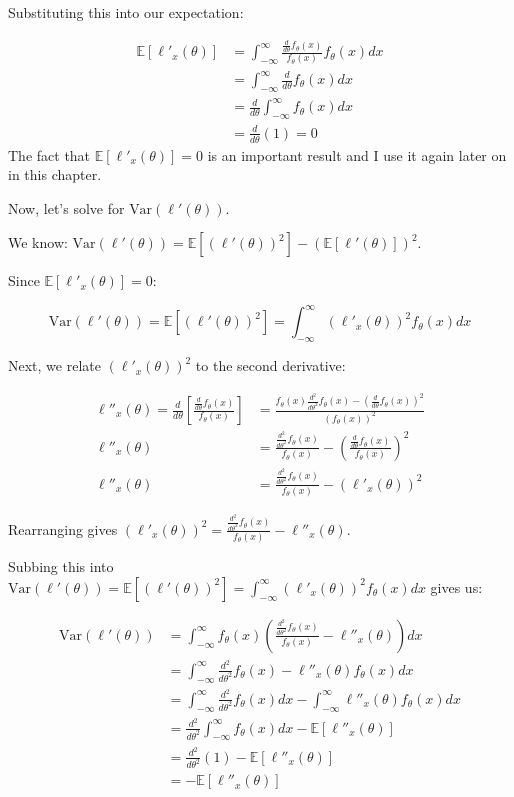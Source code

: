 \documentclass[
  letterpaper,
  DIV=11,
  numbers=noendperiod]{scrreprt}
\begin{document}
Substituting this into our expectation:

\[
\begin{aligned}
\mathbb{E}[\ell'_x(\theta)] &= \int_{-\infty}^\infty \frac{\frac{d}{d \theta} f_\theta(x)}{f_\theta(x)} f_\theta(x) dx \\
&= \int_{-\infty}^\infty \frac{d}{d \theta} f_\theta(x) dx \\
&= \frac{d}{d \theta} \int_{-\infty}^\infty f_\theta(x) dx \\
&= \frac{d}{d \theta} (1) = 0
\end{aligned}
\] The fact that \(\mathbb{E}[\ell'_x(\theta)] = 0\) is an important
result and I use it again later on in this chapter.

Now, let's solve for \(\text{Var}(\ell'(\theta))\).

We know:
\(\text{Var}(\ell'(\theta)) = \mathbb{E}[(\ell'(\theta))^2] - (\mathbb{E}[\ell'(\theta)])^2\).

Since \(\mathbb{E}[\ell'_x(\theta)] = 0\):

\[
\text{Var}(\ell'(\theta)) = \mathbb{E}[(\ell'(\theta))^2] = \int_{-\infty}^\infty (\ell'_x(\theta))^2 f_\theta(x) dx
\]

Next, we relate \((\ell'_x(\theta))^2\) to the second derivative:

\[
\begin{aligned}
\ell''_x(\theta) = \frac{d}{d \theta} \left[ \frac{\frac{d}{d \theta} f_\theta(x)}{f_\theta(x)} \right] &= \frac{f_\theta(x) \frac{d^2}{d \theta^2} f_\theta(x) - (\frac{d}{d \theta} f_\theta(x))^2}{(f_\theta(x))^2} \\
\ell''_x(\theta) &= \frac{\frac{d^2}{d \theta^2} f_\theta(x)}{f_\theta(x)} - \left( \frac{\frac{d}{d \theta} f_\theta(x)}{f_\theta(x)} \right)^2 \\
\ell''_x(\theta)&= \frac{\frac{d^2}{d \theta^2} f_\theta(x)}{f_\theta(x)} - (\ell'_x(\theta))^2
\end{aligned}
\]

Rearranging gives
\((\ell'_x(\theta))^2 = \frac{\frac{d^2}{d \theta^2} f_\theta(x)}{f_\theta(x)} - \ell''_x(\theta)\).

Subbing this into
\(\text{Var}(\ell'(\theta)) = \mathbb{E}[(\ell'(\theta))^2] = \int_{-\infty}^\infty (\ell'_x(\theta))^2 f_\theta(x) dx\)
gives us:

\[
\begin{aligned}
\text{Var}(\ell'(\theta)) &= \int_{-\infty}^\infty f_\theta(x) \left( \frac{\frac{d^2}{d \theta^2} f_\theta(x)}{f_\theta(x)} - \ell''_x(\theta) \right) dx \\
&= \int_{-\infty}^\infty \frac{d^2}{d \theta^2} f_\theta(x) -  \ell''_x(\theta) f_\theta(x) dx \\
&= \int_{-\infty}^\infty \frac{d^2}{d \theta^2} f_\theta(x)  dx - \int_{-\infty}^\infty \ell''_x(\theta) f_\theta(x) dx \\
&= \frac{d^2}{d\theta^2} \int_{-\infty}^\infty f_\theta(x) dx- \mathbb{E}[\ell''_x(\theta)] \\
&= \frac{d^2}{d\theta^2} (1) - \mathbb{E}[\ell''_x(\theta)] \\
&= - \mathbb{E}[\ell''_x(\theta)]
\end{aligned}
\]
\end{document}
